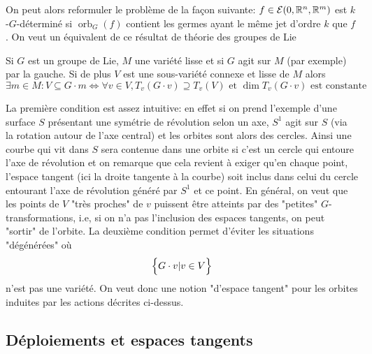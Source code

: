\documentclass[memoire.tex]{subfiles}
\begin{document}
 On peut alors reformuler le problème de la façon suivante: $f\in\mathcal{E}(0,\mathbb{R}^n,\mathbb{R}^m)$  est $k$-$G$-déterminé si $\operatorname{orb}_G(f)$ contient les germes ayant le même jet d'ordre $k$ que $f$. On veut un équivalent de ce  résultat de théorie des groupes de Lie 
\begin{theobox}{}{}
    Si $G$ est un groupe de Lie, $M$ une variété lisse et  si $G$ agit sur $M$ (par exemple) par la gauche. Si de plus $V$ est une sous-variété connexe et lisse de $M$ alors 
    \begin{equation*}
        \exists m\in M : V \subseteq G\cdot m \Leftrightarrow \forall v\in V, T_v (G\cdot v) \supseteq T_v (V)\text{ et } \dim T_v (G\cdot v) \text{ est constante }
    \end{equation*}
\end{theobox}
La première condition est assez intuitive: en effet si on prend l'exemple d'une surface $S$ présentant une symétrie de révolution selon un axe, $S^1$ agit sur $S$ (via la rotation autour de l'axe central) et les orbites sont alors des cercles. Ainsi une courbe qui vit dans $S$ sera contenue dans une orbite si c'est un cercle qui entoure l'axe de révolution et on remarque que cela revient à exiger qu'en chaque point, l'espace tangent (ici la droite tangente à la courbe) soit inclus dans celui du cercle entourant l'axe de révolution généré par $S^1$ et ce point. En général, on veut que les points  de $V$ "très proches" de $v$ puissent être atteints par des "petites" $G$-transformations, i.e, si on n'a pas l'inclusion des espaces tangents, on peut "sortir" de l'orbite. La deuxième condition permet d'éviter les situations "dégénérées" où 
\begin{equation*}
    \Bigl\{G\cdot v | v\in V\Bigr\}  
\end{equation*}
n'est pas une variété. On veut donc une notion "d'espace tangent" pour les orbites induites par les actions décrites ci-dessus.\\




\subsection{Déploiements et espaces tangents}
\end{document}
